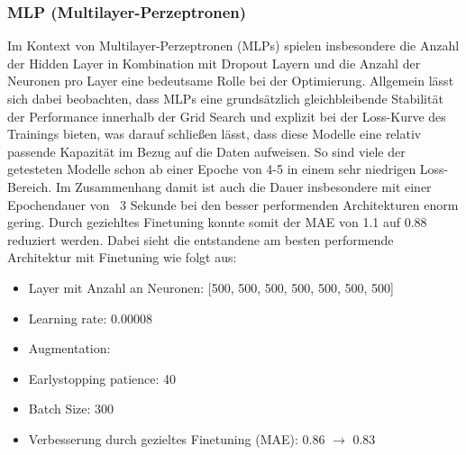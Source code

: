 \documentclass[manuscript,screen,review]{acmart} %
\begin{document}
\subsubsection*{MLP (Multilayer-Perzeptronen)}
Im Kontext von Multilayer-Perzeptronen (MLPs) spielen insbesondere die Anzahl der Hidden Layer in Kombination mit Dropout Layern und die Anzahl der Neuronen pro Layer eine bedeutsame Rolle bei der Optimierung.
Allgemein lässt sich dabei beobachten, dass MLPs eine grundsätzlich gleichbleibende Stabilität der Performance innerhalb der Grid Search und explizit bei der Loss-Kurve des Trainings bieten, was darauf schließen lässt, dass diese Modelle eine relativ passende Kapazität im Bezug auf die Daten aufweisen. So sind viele der getesteten Modelle schon ab einer Epoche von 4-5 in einem sehr niedrigen Loss-Bereich.  Im Zusammenhang damit ist auch die Dauer insbesondere mit einer Epochendauer von ~3 Sekunde bei den besser performenden Architekturen enorm gering.
Durch geziehltes Finetuning konnte somit der MAE von 1.1 auf 0.88 reduziert werden.
Dabei sieht die entstandene am besten performende Architektur mit Finetuning wie folgt aus:
\begin{itemize}
    \item Layer mit Anzahl an Neuronen: [500, 500, 500, 500, 500, 500, 500]
    \item Learning rate: 0.00008
    \item Augmentation: 
    \item Earlystopping patience: 40
    \item Batch Size: 300
    \item Verbesserung durch gezieltes Finetuning (MAE): 0.86 $\rightarrow$ 0.83
\end{itemize}

\end{document}
